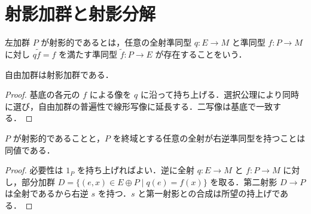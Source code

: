 \section{射影加群と射影分解}
\begin{defn}[射影加群]
左加群 $P$ が射影的であるとは，任意の全射準同型 $q:E\to M$ と準同型 $f:P\to M$ に対し $q\widetilde f=f$ を満たす準同型 $\widetilde f:P\to E$ が存在することをいう．
\end{defn}
\begin{prop}[自由加群の射影性]
自由加群は射影加群である．
\end{prop}
\begin{proof}
基底の各元の $f$ による像を $q$ に沿って持ち上げる．選択公理により同時に選び，自由加群の普遍性で線形写像に延長する．二写像は基底で一致する．
\end{proof}
\begin{prop}[射影性の分裂による判定]
$P$ が射影的であることと，$P$ を終域とする任意の全射が右逆準同型を持つことは同値である．
\end{prop}
\begin{proof}
必要性は $1_P$ を持ち上げればよい．逆に全射 $q:E\to M$ と $f:P\to M$ に対し，部分加群 $D=\{(e,x)\in E\oplus P\mid q(e)=f(x)\}$ を取る．第二射影 $D\to P$ は全射であるから右逆 $s$ を持つ．$s$ と第一射影との合成は所望の持上げである．
\end{proof}
